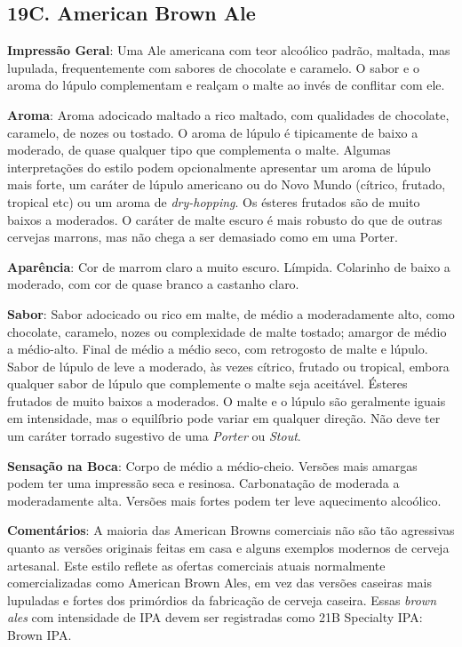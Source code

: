 \subsection*{19C. American Brown Ale}
\textbf{Impressão Geral}: Uma Ale americana com teor alcoólico padrão, maltada, mas lupulada, frequentemente com sabores de chocolate e caramelo. O sabor e o aroma do lúpulo complementam e realçam o malte ao invés de conflitar com ele.

\textbf{Aroma}: Aroma adocicado maltado a rico maltado, com qualidades de chocolate, caramelo, de nozes ou tostado. O aroma de lúpulo é tipicamente de baixo a moderado, de quase qualquer tipo que complementa o malte. Algumas interpretações do estilo podem opcionalmente apresentar um aroma de lúpulo mais forte, um caráter de lúpulo americano ou do Novo Mundo (cítrico, frutado, tropical etc) ou um aroma de \textit{dry-hopping}. Os ésteres frutados são de muito baixos a moderados. O caráter de malte escuro é mais robusto do que de outras cervejas marrons, mas não chega a ser demasiado como em uma Porter.

\textbf{Aparência}: Cor de marrom claro a muito escuro. Límpida. Colarinho de baixo a moderado, com cor de quase branco a castanho claro.

\textbf{Sabor}: Sabor adocicado ou rico em malte, de médio a moderadamente alto, como chocolate, caramelo, nozes ou complexidade de malte tostado; amargor de médio a médio-alto. Final de médio a médio seco, com retrogosto de malte e lúpulo. Sabor de lúpulo de leve a moderado, às vezes cítrico, frutado ou tropical, embora qualquer sabor de lúpulo que complemente o malte seja aceitável. Ésteres frutados de muito baixos a moderados. O malte e o lúpulo são geralmente iguais em intensidade, mas o equilíbrio pode variar em qualquer direção. Não deve ter um caráter torrado sugestivo de uma \textit{Porter} ou \textit{Stout}.

\textbf{Sensação na Boca}: Corpo de médio a médio-cheio. Versões mais amargas podem ter uma impressão seca e resinosa. Carbonatação de moderada a moderadamente alta. Versões mais fortes podem ter leve aquecimento alcoólico.

\textbf{Comentários}: A maioria das American Browns comerciais não são tão agressivas quanto as versões originais feitas em casa e alguns exemplos modernos de cerveja artesanal. Este estilo reflete as ofertas comerciais atuais normalmente comercializadas como American Brown Ales, em vez das versões caseiras mais lupuladas e fortes dos primórdios da fabricação de cerveja caseira. Essas \textit{brown ales} com intensidade de IPA devem ser registradas como 21B Specialty IPA: Brown IPA.

